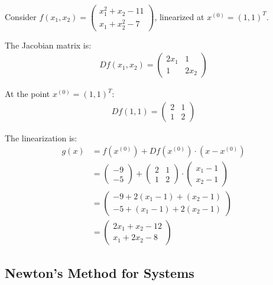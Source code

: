 \begin{example}
Consider $f(x_1, x_2) = \begin{pmatrix} x_1^2 + x_2 - 11 \\ x_1 + x_2^2 - 7 \end{pmatrix}$, linearized at $x^{(0)} = (1,1)^T$.

The Jacobian matrix is:
\begin{align*}
Df(x_1, x_2) = \begin{pmatrix} 2x_1 & 1 \\ 1 & 2x_2 \end{pmatrix}
\end{align*}

At the point $x^{(0)} = (1,1)^T$:
\begin{align*}
Df(1,1) = \begin{pmatrix} 2 & 1 \\ 1 & 2 \end{pmatrix}
\end{align*}

The linearization is:
\begin{align*}
g(x) &= f(x^{(0)}) + Df(x^{(0)}) \cdot (x - x^{(0)})\\
&= \begin{pmatrix} -9 \\ -5 \end{pmatrix} + \begin{pmatrix} 2 & 1 \\ 1 & 2 \end{pmatrix} \cdot \begin{pmatrix} x_1 - 1 \\ x_2 - 1 \end{pmatrix}\\
&= \begin{pmatrix} -9 + 2(x_1 - 1) + (x_2 - 1) \\ -5 + (x_1 - 1) + 2(x_2 - 1) \end{pmatrix}\\
&= \begin{pmatrix} 2x_1 + x_2 - 12 \\ x_1 + 2x_2 - 8 \end{pmatrix}
\end{align*}
\end{example}

\subsection{Newton's Method for Systems}

